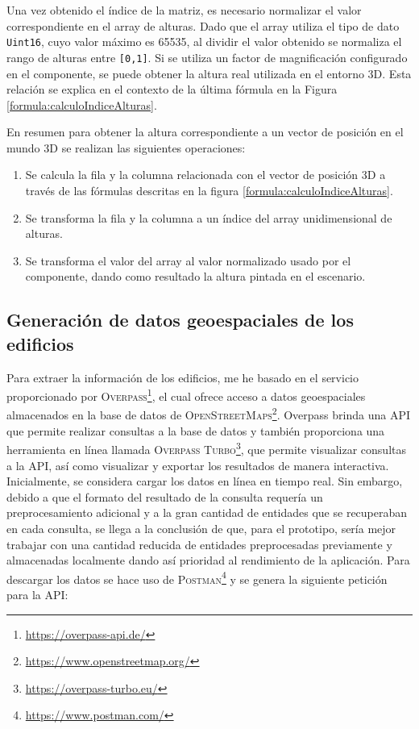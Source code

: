 \documentclass[a4paper, 11pt]{book}
\begin{document}
Una vez obtenido el índice de la matriz, es necesario normalizar el valor correspondiente en el array de alturas. Dado que el array utiliza el tipo de dato \texttt{Uint16}, cuyo valor máximo es 65535, al dividir el valor obtenido se normaliza el rango de alturas entre \texttt{[0,1]}. Si se utiliza un factor de magnificación configurado en el componente, se puede obtener la altura real utilizada en el entorno 3D. Esta relación se explica en el contexto de la última fórmula en la Figura \ref{formula:calculoIndiceAlturas}.

En resumen para obtener la altura correspondiente a un vector de posición en el mundo 3D se realizan las siguientes operaciones:
\begin{enumerate}
	\item Se calcula la fila y la columna relacionada con el vector de posición 3D a través de las fórmulas descritas en la figura \ref{formula:calculoIndiceAlturas}.
	\item Se transforma la fila y la columna a un índice del array unidimensional de alturas.
	\item Se transforma el valor del array al valor normalizado usado por el componente, dando como resultado la altura pintada en el escenario.
\end{enumerate}

\subsection{Generación de datos geoespaciales de los edificios}
\label{subsec:buildingData}
Para extraer la información  de los edificios, me he basado en el servicio proporcionado por \textsc{Overpass}\footnote{\url{https://overpass-api.de/}}, el cual ofrece acceso a datos geoespaciales almacenados en la base de datos de \textsc{OpenStreetMaps}\footnote{\url{https://www.openstreetmap.org/}}. 
Overpass brinda una \textsc{API} que permite realizar consultas a la base de datos y también proporciona una herramienta en línea llamada \textsc{Overpass Turbo}\footnote{\url{https://overpass-turbo.eu/}}, que permite visualizar consultas a la \textsc{API}, así como visualizar y exportar los resultados de manera interactiva.
Inicialmente, se considera cargar los datos en línea en tiempo real. Sin embargo, debido a que el formato del resultado de la consulta requería un preprocesamiento adicional y a la gran cantidad de entidades que se recuperaban en cada consulta, se llega a la conclusión de que, para el prototipo, sería mejor trabajar con una cantidad reducida de entidades preprocesadas previamente y almacenadas localmente dando así prioridad al rendimiento de la aplicación.
Para descargar los datos se hace uso de \textsc{Postman}\footnote{\url{https://www.postman.com/}} y se genera la siguiente petición para la \textsc{API}:
\end{document}
